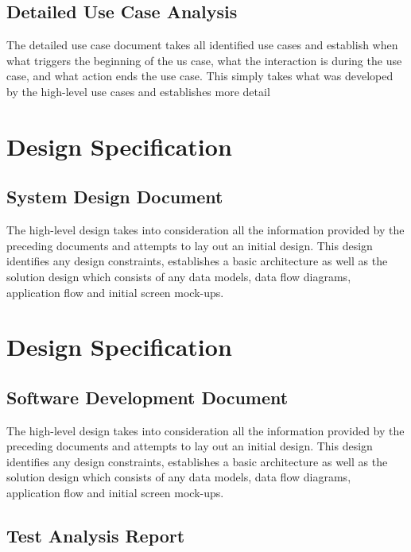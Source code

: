 \documentclass[a4paper]{article}
\begin{document}
\subsection {Detailed Use Case Analysis}
The detailed use case document takes all identified use cases and establish when what triggers the
beginning of the us case, what the interaction is during the use case, and what action ends the use case.  This simply takes what
was developed by the high-level use cases and establishes more detail

\section {Design Specification}
\subsection {System Design Document}

The high-level design takes into consideration all the information provided by the preceding documents
and attempts to lay out an initial design.  This design identifies any design constraints, establishes a basic architecture as well as
the solution design which consists of any data models, data flow diagrams, application flow and initial screen mock-ups.




\section {Design Specification}
\subsection {Software Development Document}

The high-level design takes into consideration all the information provided by the preceding documents
and attempts to lay out an initial design.  This design identifies any design constraints, establishes a basic architecture as well as
the solution design which consists of any data models, data flow diagrams, application flow and initial screen mock-ups.
\subsection {Test Analysis Report}
\end{document}
